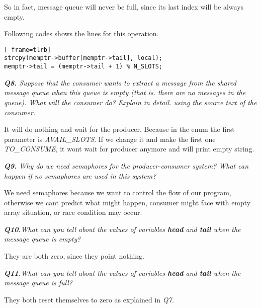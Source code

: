 \documentclass[11pt]{article}
\begin{document}
So in fact, message queue will never be full, since its last index will be always empty.

Following codes shows the lines for this operation.

\vspace{5mm}
\begin{minipage}{1\textwidth}
\begin{lstlisting}[ frame=tlrb]
strcpy(memptr->buffer[memptr->tail], local);
memptr->tail = (memptr->tail + 1) % N_SLOTS;
\end{lstlisting}
\end{minipage}



\vspace{5mm}
\textit{\textbf{Q8.} Suppose that the consumer wants to extract a message from the shared message queue when this queue is empty (that is. there are no messages in the queue). What will the consumer do? Explain in detail. using the source text of the consumer.}
\vspace{5mm}

It will do nothing and wait for the producer. Because in the enum the first parameter is \textit{AVAIL\_SLOTS}. If we change it and make the first one \textit{TO\_CONSUME}, it wont wait for producer anymore and will print empty string.

\vspace{5mm}
\textit{\textbf{Q9.}  Why do we need semaphores for the producer-consumer system? What can happen if no semaphores are used in this system? }
\vspace{5mm}

We need semaphores because we want to control the flow of our program, otherwise we cant predict what might happen, consumer might face with empty array situation, or race condition may occur.


\vspace{5mm}
\textit{\textbf{Q10.}What can you tell about the values of variables \textbf{ head} and \textbf{ tail} when the message queue is empty?}
\vspace{5mm}

They are both zero, since they point nothing.

\vspace{5mm}
\textit{\textbf{Q11.}What can you tell about the values of variables \textbf{ head} and \textbf{ tail} when the message queue is full?}
\vspace{5mm}

They both reset themselves to zero as explained in \textit{Q7.}
\end{document}
